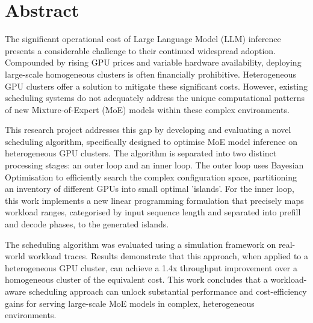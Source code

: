 \chapter*{Abstract}

The significant operational cost of Large Language Model (LLM) inference presents a considerable challenge to their continued widespread adoption.
Compounded by rising GPU prices and variable hardware availability, deploying large-scale homogeneous clusters is often financially prohibitive. 
Heterogeneous GPU clusters offer a solution to mitigate these significant costs.
However, existing scheduling systems do not adequately address the unique computational patterns of new Mixture-of-Expert (MoE) models within these complex environments.

This research project addresses this gap by developing and evaluating a novel scheduling algorithm, specifically designed to optimise MoE model inference on heterogeneous GPU clusters.
The algorithm is separated into two distinct processing stages: an outer loop and an inner loop.
The outer loop uses Bayesian Optimisation to efficiently search the complex configuration space, partitioning an inventory of different GPUs into small optimal 'islands'.
For the inner loop, this work implements a new linear programming formulation that precisely maps workload ranges, categorised by input sequence length and separated into prefill and decode phases, to the generated islands.

The scheduling algorithm was evaluated using a simulation framework on real-world workload traces.
Results demonstrate that this approach, when applied to a heterogeneous GPU cluster, can achieve a 1.4x throughput improvement over a homogeneous cluster of the equivalent cost.
This work concludes that a workload-aware scheduling approach can unlock substantial performance and cost-efficiency gains for serving large-scale MoE models in complex, heterogeneous environments.